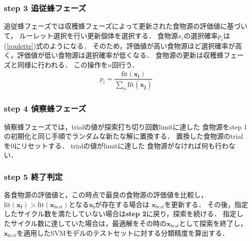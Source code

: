 \subsubsection*{step 3 追従蜂フェーズ}
追従蜂フェーズでは収穫蜂フェーズによって更新された食物源の評価値に基づいて，
ルーレット選択を行い更新個体を選択する．
食物源$x_i$の選択確率$p_i$は(\ref{roulette})式のようになる．
そのため，評価値が高い食物源ほど選択確率が高く，評価値が低い食物源は選択確率が低くなる．
食物源の更新は収穫蜂フェーズと同様に行われる．
この操作を$n$回行う．
\begin{align}
    p_i = \dfrac{\mathrm{fit}(\boldsymbol{x_{i}})}{\sum_{n}\mathrm{fit}(\boldsymbol{x_{j}})}
\end{align}
\subsubsection*{step 4 偵察蜂フェーズ}
偵察蜂フェーズでは，trialの値が探索打ち切り回数limitに達した
食物源をstep 1 の初期化と同じ手順でランダムな新たな解に置換する． 
置換した食物源のtrialを0にリセットする．
trialの値がlimitに達した
食物源がなければ何も行わない．
\subsubsection*{step 5 終了判定}
各食物源の評価値と，この時点で最良の食物源の評価値を比較し，
$\mathrm{fit}(\boldsymbol{x_{i}}) > \mathrm{fit}(\boldsymbol{x}_{best})$となる$\boldsymbol{x_{i}}$が存在する場合は
$\boldsymbol{x}_{best}$を更新する．
その後，指定したサイクル数を満たしていない場合は\textbf{step 2}に戻り，探索を続ける．
指定したサイクル数に達していた場合は，最適解をその時の$\boldsymbol{x}_{best}$として探索を終了し，
$\boldsymbol{x}_{best}$を適用したSVMモデルのテストセットに対する分類精度を算出する．